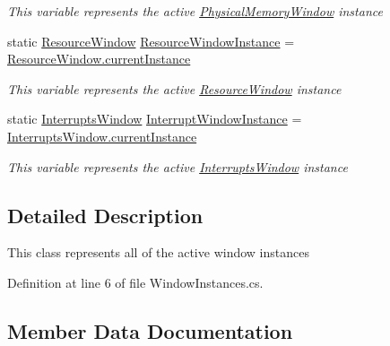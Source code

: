 \begin{DoxyCompactItemize}
\begin{DoxyCompactList}\small\item\em This variable represents the active \hyperlink{class_c_p_u___o_s___simulator_1_1_physical_memory_window}{Physical\+Memory\+Window} instance \end{DoxyCompactList}\item 
static \hyperlink{class_c_p_u___o_s___simulator_1_1_resource_window}{Resource\+Window} \hyperlink{class_c_p_u___o_s___simulator_1_1_window_bridge_1_1_window_instances_ae14b526e09cf4e52c0362ef1f00d16f3}{Resource\+Window\+Instance} = \hyperlink{class_c_p_u___o_s___simulator_1_1_resource_window_ab7b497079faa3ac3c9cea83834222bb5}{Resource\+Window.\+current\+Instance}
\begin{DoxyCompactList}\small\item\em This variable represents the active \hyperlink{class_c_p_u___o_s___simulator_1_1_resource_window}{Resource\+Window} instance \end{DoxyCompactList}\item 
static \hyperlink{class_c_p_u___o_s___simulator_1_1_interrupts_window}{Interrupts\+Window} \hyperlink{class_c_p_u___o_s___simulator_1_1_window_bridge_1_1_window_instances_a63548e665d920e3a7aa8bc70a80ff229}{Interrupt\+Window\+Instance} = \hyperlink{class_c_p_u___o_s___simulator_1_1_interrupts_window_ad73f79539e1ba0a2e3c6cd366a3cac05}{Interrupts\+Window.\+current\+Instance}
\begin{DoxyCompactList}\small\item\em This variable represents the active \hyperlink{class_c_p_u___o_s___simulator_1_1_interrupts_window}{Interrupts\+Window} instance \end{DoxyCompactList}\end{DoxyCompactItemize}


\subsection{Detailed Description}
This class represents all of the active window instances 



Definition at line 6 of file Window\+Instances.\+cs.



\subsection{Member Data Documentation}
\hypertarget{class_c_p_u___o_s___simulator_1_1_window_bridge_1_1_window_instances_a90b746b2373f150cab75e4dee0f91c45}{}
